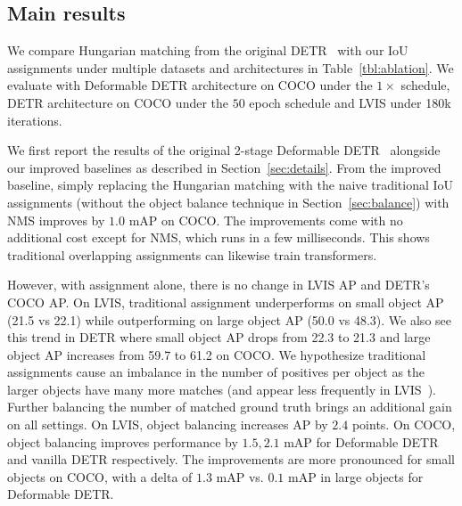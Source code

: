 \documentclass[10pt,twocolumn,letterpaper]{article}
\newcommand{\refsec}[1]{Section~\ref{sec:#1}}
\newcommand{\reftbl}[1]{Table~\ref{tbl:#1}}
\begin{document}
\subsection{Main results}
We compare Hungarian matching from the original DETR~\cite{carion2020end} with our IoU assignments under multiple datasets and architectures in \reftbl{ablation}.
We evaluate with Deformable DETR architecture on COCO under the $1\times$ schedule, DETR architecture on COCO under the $50$ epoch schedule and LVIS under 180k iterations.

We first report the results of the original 2-stage Deformable DETR~\cite{zhu2020deformable} alongside our improved baselines as described in \refsec{details}.
From the improved baseline, simply replacing the Hungarian matching with the naive traditional IoU assignments (without the object balance technique in \refsec{balance}) with NMS improves by $1.0$ mAP on COCO.
The improvements come with no additional cost except for NMS, which runs in a few milliseconds.
This shows traditional overlapping assignments can likewise train transformers.

However, with assignment alone, there is no change in LVIS AP and DETR's COCO AP.
On LVIS, traditional assignment underperforms on small object AP (21.5 vs 22.1) while outperforming on large object AP (50.0 vs 48.3).
We also see this trend in DETR where small object AP drops from 22.3 to 21.3 and large object AP increases from 59.7 to 61.2 on COCO.
We hypothesize traditional assignments cause an imbalance in the number of positives per object as the larger objects have many more matches (and appear less frequently in LVIS~\cite{gupta2019lvis}).
Further balancing the number of matched ground truth brings an additional gain on all settings.
On LVIS, object balancing increases AP by $2.4$ points.
On COCO, object balancing improves performance by $1.5,2.1$ mAP for Deformable DETR and vanilla DETR respectively.
The improvements are more pronounced for small objects on COCO, with a delta of $1.3$ mAP vs. $0.1$ mAP in large objects for Deformable DETR.
\end{document}
